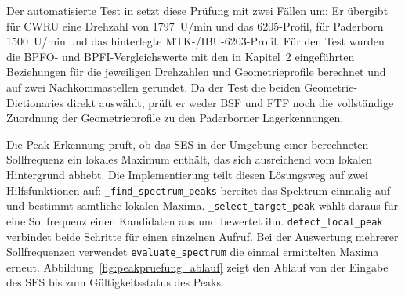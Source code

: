 Der automatisierte Test in  setzt diese
Prüfung mit zwei Fällen um: Er übergibt für CWRU eine Drehzahl von
1797~U/min und das 6205-Profil, für Paderborn 1500~U/min und das hinterlegte
MTK-/IBU-6203-Profil. Für den Test wurden die BPFO- und BPFI-Vergleichswerte
mit den in Kapitel~2 eingeführten Beziehungen für die jeweiligen Drehzahlen und
Geometrieprofile berechnet und auf zwei Nachkommastellen gerundet. Da der Test
die beiden Geometrie-Dictionaries direkt auswählt, prüft er weder BSF und FTF
noch die vollständige Zuordnung der Geometrieprofile zu den Paderborner
Lagerkennungen.

\label{subsec:peaks_impl}

Die Peak-Erkennung prüft, ob das \acrshort{SES} in der Umgebung einer
berechneten Sollfrequenz ein lokales Maximum enthält, das sich ausreichend vom
lokalen Hintergrund abhebt. Die Implementierung teilt diesen Lösungsweg auf
zwei Hilfsfunktionen auf: \texttt{\_find\_spectrum\_peaks} bereitet das
Spektrum einmalig auf und bestimmt sämtliche lokalen Maxima.
\texttt{\_select\_target\_peak} wählt daraus für eine Sollfrequenz einen
Kandidaten aus und bewertet ihn. \texttt{detect\_local\_peak} verbindet beide
Schritte für einen einzelnen Aufruf. Bei der Auswertung mehrerer
Sollfrequenzen verwendet \texttt{evaluate\_spectrum} die einmal ermittelten
Maxima erneut. Abbildung~\ref{fig:peakpruefung_ablauf} zeigt den Ablauf von der
Eingabe des \acrshort{SES} bis zum Gültigkeitsstatus des Peaks.

